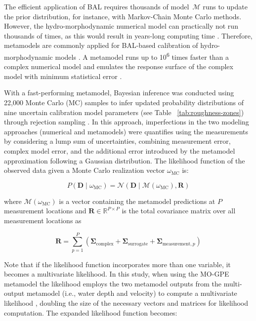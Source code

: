 \documentclass[draft,linenumbers,onecolumn]{agujournal2019} %
\begin{document}
The efficient application of BAL requires thousands of model~$\mathcal{M}$ runs to update the prior distribution, for instance, with Markov-Chain Monte Carlo methods. However, the hydro-morphodynamic numerical model can practically not run thousands of times, as this would result in years-long computing time \cite{oladyshkin2020bayesian3}. Therefore, metamodels are commonly applied for BAL-based calibration of hydro-morphodynamic models \cite{beckers2020bayesian, mouris2023stability, schwindt2023bayesian}.  A metamodel runs up to 10\textsuperscript{6} times faster than a complex numerical model and emulates the response surface of the complex model with minimum statistical error \cite{beckers2020bayesian}.

With a fast-performing metamodel, Bayesian inference was conducted using 22,000 Monte Carlo (MC) samples to infer updated probability distributions of nine uncertain calibration model parameters (see Table ~\ref{tab:roughness-zones}) through rejection sampling \cite{smith1992bayesian}. In this approach, imperfections in the two modeling approaches (numerical and metamodels) were quantifies using the measurements by considering a lump sum of uncertainties, combining measurement error, complex model error, and the additional error introduced by the metamodel approximation following a Gaussian distribution. The likelihood function of the observed data given a Monte Carlo realization vector $\omega_{\text{MC}}$ is:

\begin{equation} \label{eq:mc}
	P(\mathbf{D} \mid \omega_{\text{MC}}) = \mathcal{N}(\mathbf{D} \mid \mathcal{M}(\omega_{\text{MC}}), \bm{R})
\end{equation}

where $\mathcal{M}(\omega_{\text{MC}})$ is a vector containing the metamodel predictions at $P$ measurement locations and $\bm{R} \in \mathbb{R}^{P \times P}$ is the total covariance matrix over all measurement locations as

\begin{equation} \label{eq:covar}
	\mathbf{R} = \sum_{p=1}^{P} \left( \mathbf{\Sigma}_{\text{complex}} + \mathbf{\Sigma}_{\text{surrogate}} + \mathbf{\Sigma}_{\text{measurement},p} \right)
\end{equation}

Note that if the likelihood function incorporates more than one variable, it becomes a multivariate likelihood. In this study, when using the MO-GPE metamodel the likelihood employs the two metamodel outputs from the multi-output metamodel (i.e., water depth and velocity) to compute a multivariate likelihood , doubling the size of the necessary vectors and matrices for likelihood computation. The expanded likelihood function becomes: 
\end{document}
